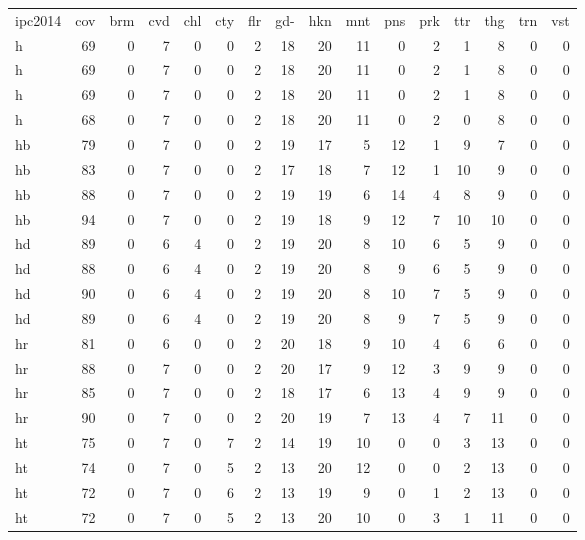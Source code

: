 \begin{center}
\begin{tabular}{lrrrrrrrrrrrrrrr}
ipc2014 & cov & brm & cvd & chl & cty & flr & gd- & hkn & mnt & pns & prk & ttr & thg & trn & vst\\
h & 69 & 0 & 7 & 0 & 0 & 2 & 18 & 20 & 11 & 0 & 2 & 1 & 8 & 0 & 0\\
h & 69 & 0 & 7 & 0 & 0 & 2 & 18 & 20 & 11 & 0 & 2 & 1 & 8 & 0 & 0\\
h & 69 & 0 & 7 & 0 & 0 & 2 & 18 & 20 & 11 & 0 & 2 & 1 & 8 & 0 & 0\\
h & 68 & 0 & 7 & 0 & 0 & 2 & 18 & 20 & 11 & 0 & 2 & 0 & 8 & 0 & 0\\
hb & 79 & 0 & 7 & 0 & 0 & 2 & 19 & 17 & 5 & 12 & 1 & 9 & 7 & 0 & 0\\
hb & 83 & 0 & 7 & 0 & 0 & 2 & 17 & 18 & 7 & 12 & 1 & 10 & 9 & 0 & 0\\
hb & 88 & 0 & 7 & 0 & 0 & 2 & 19 & 19 & 6 & 14 & 4 & 8 & 9 & 0 & 0\\
hb & 94 & 0 & 7 & 0 & 0 & 2 & 19 & 18 & 9 & 12 & 7 & 10 & 10 & 0 & 0\\
hd & 89 & 0 & 6 & 4 & 0 & 2 & 19 & 20 & 8 & 10 & 6 & 5 & 9 & 0 & 0\\
hd & 88 & 0 & 6 & 4 & 0 & 2 & 19 & 20 & 8 & 9 & 6 & 5 & 9 & 0 & 0\\
hd & 90 & 0 & 6 & 4 & 0 & 2 & 19 & 20 & 8 & 10 & 7 & 5 & 9 & 0 & 0\\
hd & 89 & 0 & 6 & 4 & 0 & 2 & 19 & 20 & 8 & 9 & 7 & 5 & 9 & 0 & 0\\
hr & 81 & 0 & 6 & 0 & 0 & 2 & 20 & 18 & 9 & 10 & 4 & 6 & 6 & 0 & 0\\
hr & 88 & 0 & 7 & 0 & 0 & 2 & 20 & 17 & 9 & 12 & 3 & 9 & 9 & 0 & 0\\
hr & 85 & 0 & 7 & 0 & 0 & 2 & 18 & 17 & 6 & 13 & 4 & 9 & 9 & 0 & 0\\
hr & 90 & 0 & 7 & 0 & 0 & 2 & 20 & 19 & 7 & 13 & 4 & 7 & 11 & 0 & 0\\
ht & 75 & 0 & 7 & 0 & 7 & 2 & 14 & 19 & 10 & 0 & 0 & 3 & 13 & 0 & 0\\
ht & 74 & 0 & 7 & 0 & 5 & 2 & 13 & 20 & 12 & 0 & 0 & 2 & 13 & 0 & 0\\
ht & 72 & 0 & 7 & 0 & 6 & 2 & 13 & 19 & 9 & 0 & 1 & 2 & 13 & 0 & 0\\
ht & 72 & 0 & 7 & 0 & 5 & 2 & 13 & 20 & 10 & 0 & 3 & 1 & 11 & 0 & 0\\
\end{tabular}
\end{center}
